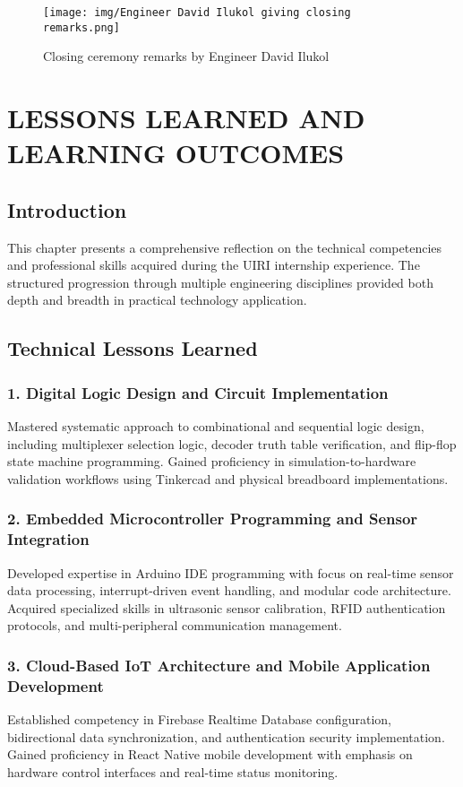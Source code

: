 \documentclass[12pt,a4paper]{report}
\begin{document}
\begin{figure}[H]
\centering
\texttt{[image: img/Engineer David Ilukol giving closing remarks.png]}
\caption{Closing ceremony remarks by Engineer David Ilukol}
\label{fig:closing-remarks}
\end{figure}

\chapter{LESSONS LEARNED AND LEARNING OUTCOMES}

\section{Introduction}

This chapter presents a comprehensive reflection on the technical competencies and professional skills acquired during the UIRI internship experience. The structured progression through multiple engineering disciplines provided both depth and breadth in practical technology application.

\section{Technical Lessons Learned}

\subsection*{1. Digital Logic Design and Circuit Implementation}
Mastered systematic approach to combinational and sequential logic design, including multiplexer selection logic, decoder truth table verification, and flip-flop state machine programming. Gained proficiency in simulation-to-hardware validation workflows using Tinkercad and physical breadboard implementations.

\subsection*{2. Embedded Microcontroller Programming and Sensor Integration}
Developed expertise in Arduino IDE programming with focus on real-time sensor data processing, interrupt-driven event handling, and modular code architecture. Acquired specialized skills in ultrasonic sensor calibration, RFID authentication protocols, and multi-peripheral communication management.

\subsection*{3. Cloud-Based IoT Architecture and Mobile Application Development}
Established competency in Firebase Realtime Database configuration, bidirectional data synchronization, and authentication security implementation. Gained proficiency in React Native mobile development with emphasis on hardware control interfaces and real-time status monitoring.
\end{document}
